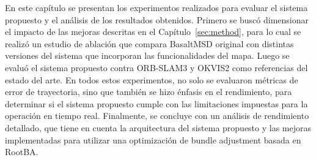 






En este capítulo se presentan los experimentos realizados para evaluar el sistema propuesto y el análisis de los resultados obtenidos. Primero se buscó dimensionar el impacto de las mejoras descritas en el Capítulo~\ref{sec:method}, para lo cual se realizó un estudio de ablación que compara BasaltMSD original con distintas versiones del sistema que incorporan las funcionalidades del mapa. Luego se evaluó el sistema propuesto contra ORB-SLAM3 y OKVIS2 como referencias del estado del arte. En todos estos experimentos, no solo se evaluaron métricas de error de trayectoria, sino que también se hizo énfasis en el rendimiento, para determinar si el sistema propuesto cumple con las limitaciones impuestas para la operación en tiempo real. Finalmente, se concluye con un análisis de rendimiento detallado, que tiene en cuenta la arquitectura del sistema propuesto y las mejoras implementadas para utilizar una optimización de bundle adjustment basada en RootBA.

